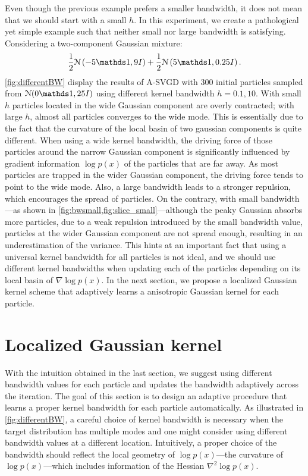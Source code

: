 Even though the previous example prefers a smaller bandwidth, it does not
mean that we should start with a small $h$.
In this experiment, we create a pathological yet simple example such that
neither small nor large bandwidth is satisfying.
Considering a two-component Gaussian mixture:
\[
\frac{1}{2}\distNorm\left( -5 \ind, 9I \right)  + \frac{1}{2}\distNorm\left( 5\ind, 0.25I \right).
\]
\cref{fig:differentBW} display the results of A-SVGD with $300$ initial
particles sampled from $\distNorm(0\ind, 25I )$ using different kernel
bandwidth $h = 0.1, 10$. With small $h$ particles located in the wide
Gaussian component are overly contracted; with large $h$, almost all
particles converges to the wide mode.
This is essentially due to the fact that the curvature of the local basin of
two gaussian components is quite different. When using a wide kernel
bandwidth, the driving force of those particles around the narrow Gaussian
component is significantly influenced by gradient information $\log p(x)$ of
the particles that are far away. As most particles are trapped in the wider
Gaussian component, the driving force tends to point to the wide mode. Also,
a large bandwidth leads to a stronger repulsion, which encourages the spread
of particles. On the contrary, with small bandwidth---as shown in
\cref{fig:bwsmall,fig:slice_small}---although the peaky Gaussian absorbs more
particles, due to a weak repulsion introduced by the small bandwidth value,
particles at the wider Gaussian component are not spread enough, resulting in
an underestimation of the variance.
This hints at an important fact that using a universal kernel bandwidth for
all particles is not ideal, and we should use different kernel bandwidths
when updating each of the particles depending on its local basin of $\nabla
\log p(x)$. In the next section, we propose a localized Gaussian kernel  scheme that adaptively learns a anisotropic Gaussian kernel for each particle.




\section{Localized Gaussian kernel} \label{sec:bw}

With the intuition obtained in the last section, we suggest using different
bandwidth values for each particle and updates the bandwidth adaptively
across the iteration. The goal of this section is to design an adaptive
procedure that learns a proper kernel bandwidth for each particle
automatically. As illustrated in \cref{fig:differentBW}, a careful choice of
kernel bandwidth is necessary when the target distribution has multiple modes
and one might consider using different bandwidth values at a different
location. Intuitively, a proper choice of the bandwidth should reflect the
local geometry of $\log p(x)$---the curvature of $\log p(x)$---which includes
information of the Hessian $\nabla^2 \log p(x)$.

